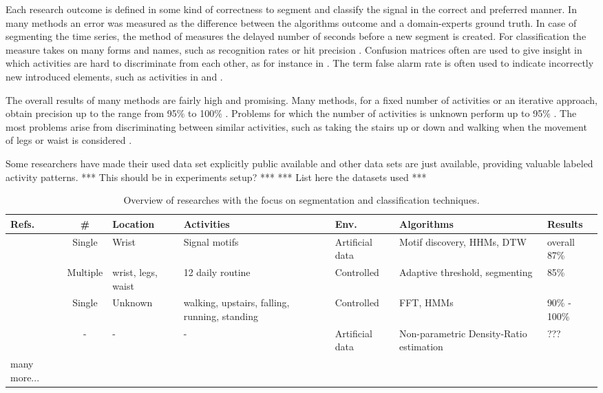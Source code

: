 Each research outcome is defined in some kind of correctness to segment and classify the signal in the correct and preferred manner.
In many methods an error was measured as the difference between the algorithms outcome and a domain-experts ground truth.
In case of segmenting the time series, the method of \cite{guenterberg2009automatic} measures the delayed number of seconds before a new segment is created.
For classification the measure takes on many forms and names, such as recognition rates \cite{bao2004activity} or hit precision \cite{ahmed2012non}.
Confusion matrices often are used to give insight in which activities are hard to discriminate from each other, as for instance in \cite{kwapisz2011activity}.
The term false alarm rate is often used to indicate incorrectly new introduced elements, such as activities in \cite{ahmed2012non} and \cite{kawahara2009change}.

The overall results of many methods are fairly high and promising.
Many methods, for a fixed number of activities or an iterative approach, obtain precision up to the range from 95\% to 100\% \cite{minnen2006discovering, shi2009towards, kwapisz2011activity, duque2012offline, he2009activity, lee2178physical, siirtola2012recognizing}.
Problems for which the number of activities is unknown perform up to 95\% \cite{ahmed2012non, barbivc2004segmenting}.
The most problems arise from discriminating between similar activities, such as taking the stairs up or down and walking when the movement of legs or waist is considered \cite{kwapisz2011activity, duque2012offline}.

Some researchers have made their used data set explicitly public available and other data sets are just available, providing valuable labeled activity patterns. *** This should be in experiments setup? ***
*** List here the datasets used ***

\begin{table}
\tiny
\centering
\begin{tabular}{ | l | c | p{1.5cm} | p{1.5cm} | p{1.5cm} | p{2.5cm} | p{3cm} | }
  \hline
  Refs. & \# & Location & Activities & Env. & Algorithms & Results \\
  \hline
  \cite{minnen2006discovering} & Single & Wrist & Signal motifs & Artificial data & Motif discovery, HHMs, DTW & overall 87\% \\
  \hline
  \cite{guenterberg2009automatic} & Multiple & wrist, legs, waist & 12 daily routine & Controlled & Adaptive threshold, segmenting & 85\% \\
  \hline
  \cite{shi2009towards} & Single & Unknown & walking, upstairs, falling, running, standing & Controlled & FFT, HMMs & 90\% - 100\% \\
  \hline
  \cite{kawahara2009change} & - & - & - & Artificial data & Non-parametric Density-Ratio estimation & ??? \\
  \hline
  many more... & & & & & & \\
  \hline
\end{tabular}
\caption{Overview of researches with the focus on segmentation and classification techniques.}
\label{table:papers_segmentation_classification}
\end{table}